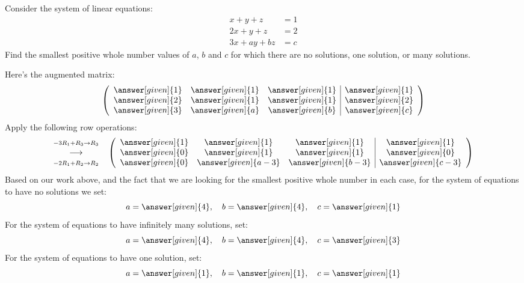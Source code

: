 \documentclass{ximera}
\begin{document}
\begin{example}
  Consider the system of linear equations:
  \begin{align*}
    x+y+z &=  1\\
    2x+y+z &=  2\\
    3x+ay+bz &= c
  \end{align*}
  Find the smallest positive whole number values of $a$, $b$ and $c$
  for which there are no solutions, one solution, or many solutions.
  \begin{explanation}
    Here's the augmented matrix:
    \[
      \left(
        \begin{array}{ccc|c}
          \answer[given]{1} &  \answer[given]{1} &  \answer[given]{1} &  \answer[given]{1} \\
          \answer[given]{2} &  \answer[given]{1} &  \answer[given]{1} &  \answer[given]{2} \\
          \answer[given]{3} &  \answer[given]{a} &  \answer[given]{b} &  \answer[given]{c}
        \end{array}
      \right)
    \]
    Apply the following row operations:
    \[
      \begin{matrix}
        \scriptstyle -3R_{1}+R_{3}\rightarrow R_{3}\\
        \longrightarrow \\
        \scriptstyle -2R_{1} + R_{2}\rightarrow R_{2}
      \end{matrix}
      \quad
      \left(
        \begin{array}{ccc|c}
          \answer[given]{1} &  \answer[given]{1} &  \answer[given]{1} &  \answer[given]{1} \\
          \answer[given]{0} &  \answer[given]{1} &  \answer[given]{1} &  \answer[given]{0} \\
          \answer[given]{0} &  \answer[given]{a-3} &  \answer[given]{b-3} &  \answer[given]{c-3}
        \end{array}
      \right)
    \]
    Based on our work above, and the fact that we are looking for the
    smallest positive whole number in each case, for the system of
    equations to have no solutions we set:
    \[
    a = \answer[given]{4}, \quad b = \answer[given]{4}, \quad c = \answer[given]{1}
    \]
    For the system of equations to have infinitely many solutions,
    set:
    \[
    a = \answer[given]{4}, \quad b = \answer[given]{4}, \quad c = \answer[given]{3}
    \]
    For the system of equations to have one solution, set:
    \[
    a = \answer[given]{1}, \quad b = \answer[given]{1}, \quad c = \answer[given]{1}
    \]
  \end{explanation}
\end{example}
\end{document}
